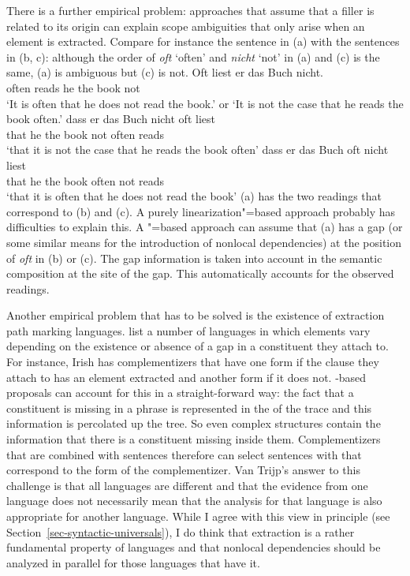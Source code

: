 There is a further empirical problem: approaches that assume that a filler is related to its origin
can explain scope ambiguities that only arise when an element is extracted. Compare for instance the
sentence in (a) with the sentences in (b, c): although the order of \emph{oft} `often' and
\emph{nicht} `not' in (a) and (c) is the same, (a) is ambiguous but (c) is
not.
\eal
\ex 
\gll Oft liest er das Buch nicht.\\
     often reads he the book not\\
\glt `It is often that he does not read the book.' or `It is not the case that he reads the book
often.'
\ex
\gll dass er das Buch nicht oft liest\\
     that he the book not often reads\\
\glt `that it is not the case that he reads the book often'
\ex
\gll dass er das Buch oft nicht liest\\
     that he the book often not reads\\
\glt `that it is often that he does not read the book'
\zl
(a) has the two readings that correspond to (b) and (c). A purely
linearization"=based approach probably has difficulties to explain this. A \slasch"=based approach
can assume that (a) has a gap (or some similar means for the introduction of nonlocal
dependencies) at the position of \emph{oft} in (b) or (c). The gap information is
taken into account in the semantic composition at the site of the gap. This automatically accounts
for the observed readings.

Another empirical problem that has to be solved is the existence of extraction path
marking
languages. \citet*{BMS2001a} list a number of languages in which elements vary depending on the
existence or absence of a gap in a constituent they attach to. For instance, Irish has
complementizers that have one form if the clause they attach to has an element extracted and another
form if it does not. \slasch-based proposals can account for this in a straight-forward way: the
fact that a constituent is missing in a phrase is represented in the \slashv of the trace and this
information is percolated up the tree. So even complex structures contain the information that there
is a constituent missing inside them. Complementizers that are combined with sentences therefore can
select sentences with \slashvs that correspond to the form of the complementizer.
Van Trijp's answer to this challenge is that all languages are different
\citep[]{vanTrijp2014a} and that the evidence from one language does not necessarily mean that the analysis for that language is
also appropriate for another language. While I agree with this view in principle (see
Section~\ref{sec-syntactic-universals}), I do think that extraction is a rather fundamental property
of languages and that nonlocal dependencies should be analyzed in parallel for those languages that
have it.


